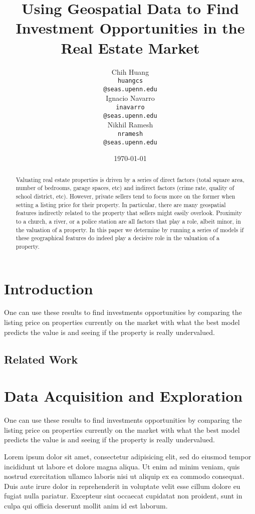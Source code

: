 \documentclass[11pt,a4paper]{article}
\title{Using Geospatial Data to Find Investment Opportunities in the Real Estate Market}
\author{Chih Huang \\
  {\tt huangcs} \\
  {\tt @seas.upenn.edu} \\\And
  Ignacio Navarro \\
  {\tt inavarro} \\
  {\tt @seas.upenn.edu} \\\And
  Nikhil Ramesh \\
  {\tt nramesh} \\
  {\tt @seas.upenn.edu}
}
\date{\today}
\begin{document}
\maketitle
\begin{abstract}
  Valuating real estate properties is driven by a series of direct 
  factors (total square area, number of bedrooms, garage spaces, etc) 
  and indirect factors (crime rate, quality of school district, etc). However, private sellers tend to focus more on the former when setting 
  a listing price for their property. In particular, there are many
  geospatial features indirectly related to the property that sellers
  might easily overlook. Proximity to a church, a river, or a police
  station are all factors that play a role, albeit minor, in the valuation
  of a property. In this paper we determine by running a series of models
  if these geographical features do indeed play a decisive role in the valuation of a property. 
\end{abstract}

\section{Introduction}

One can use these results to find 
  investments opportunities by comparing the listing price on properties
  currently on the market with what the best model predicts the value 
  is and seeing if the property is really undervalued.

\subsection{Related Work}


\section{Data Acquisition and Exploration}

One can use these results to find 
  investments opportunities by comparing the listing price on properties
  currently on the market with what the best model predicts the value 
  is and seeing if the property is really undervalued.


Lorem ipsum dolor sit amet, consectetur adipisicing elit, sed do eiusmod
tempor incididunt ut labore et dolore magna aliqua. Ut enim ad minim veniam,
quis nostrud exercitation ullamco laboris nisi ut aliquip ex ea commodo
consequat. Duis aute irure dolor in reprehenderit in voluptate velit esse
cillum dolore eu fugiat nulla pariatur. Excepteur sint occaecat cupidatat non
proident, sunt in culpa qui officia deserunt mollit anim id est laborum.
\end{document}
